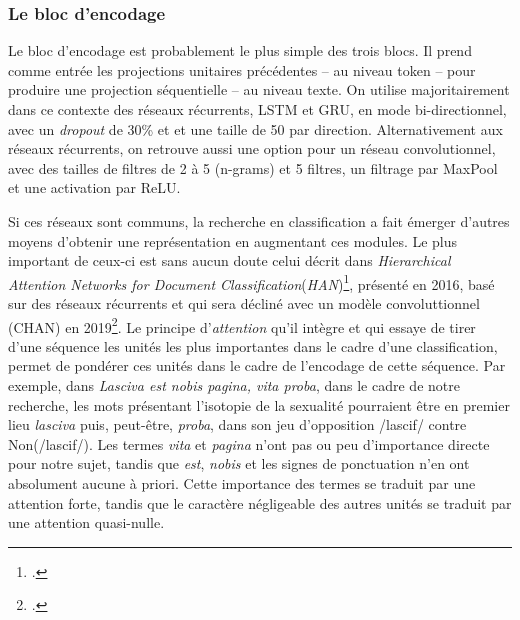\subsubsection{Le bloc d'encodage}
\label{part:chap4:architectures:variations-architectures:encodage}

Le bloc d'encodage est probablement le plus simple des trois blocs. Il prend comme entrée les projections unitaires précédentes -- au niveau token -- pour produire une projection séquentielle -- au niveau texte. On utilise majoritairement dans ce contexte des réseaux récurrents, LSTM et GRU, en mode bi-directionnel, avec un \textit{dropout} de 30\% et et une taille de 50 par direction. Alternativement aux réseaux récurrents, on retrouve aussi une option pour un réseau convolutionnel, avec des tailles de filtres de 2 à 5 (n-grams) et 5 filtres, un filtrage par MaxPool et une activation par ReLU.

Si ces réseaux sont communs, la recherche en classification a fait émerger d'autres moyens d'obtenir une représentation en augmentant ces modules. Le plus important de ceux-ci est sans aucun doute celui décrit dans \textit{Hierarchical Attention Networks for Document Classification}(\textit{HAN})\footcite{yang_hierarchical_2016}, présenté en 2016, basé sur des réseaux récurrents et qui sera décliné avec un modèle convoluttionnel (CHAN) en 2019\footcite{gao_hierarchical_2018}. Le principe d'\textit{attention} qu'il intègre et qui essaye de tirer d'une séquence les unités les plus importantes dans le cadre d'une classification, permet de pondérer ces unités dans le cadre de l'encodage de cette séquence. Par exemple, dans \textit{Lasciva est nobis pagina, vita proba}, dans le cadre de notre recherche, les mots présentant l'isotopie de la sexualité pourraient être en premier lieu \textit{lasciva} puis, peut-être, \textit{proba}, dans son jeu d'opposition /lascif/ contre Non(/lascif/). Les termes \textit{vita} et \textit{pagina} n'ont pas ou peu d'importance directe pour notre sujet, tandis que \textit{est}, \textit{nobis} et les signes de ponctuation n'en ont absolument aucune à priori. Cette importance des termes se traduit par une attention forte, tandis que le caractère négligeable des autres unités se traduit par une attention quasi-nulle.

